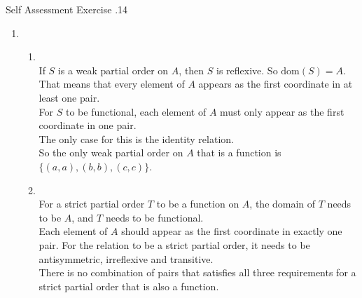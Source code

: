 \documentclass[\main/notes.tex]{subfiles}
\begin{document}
\begin{exercise}{Self Assessment Exercise \thechapter.14}
\begin{enumerate}
\begin{description}
							\end{description}
						\item {}
							\begin{enumerate}[label=(\alph*)]
								\item {}\\
									If $S$ is a weak partial order on $A$, then $S$ is reflexive. So $\mathrm{dom}(S) = A$.\\
									That means that every element of $A$ appears as the first coordinate in at least one pair.\\
									For $S$ to be functional, each element of $A$ must only appear as the first coordinate in one pair.\\
									The only case for this is the identity relation.\\
									So the only weak partial order on $A$ that is a function is $\bigl\{(a, a), (b, b), (c, c)\bigr\}$.
								\item {}\\
									For a strict partial order $T$ to be a function on $A$, the domain of $T$ needs to be $A$, and $T$ needs to be functional.\\
									Each element of $A$ should appear as the first coordinate in exactly one pair. For the relation to be a strict partial order, it needs to be antisymmetric, irreflexive and transitive.\\
									There is no combination of pairs that satisfies all three requirements for a strict partial order that is also a function.
							\end{enumerate}
					\end{enumerate}
				\end{exercise}
\end{document}
